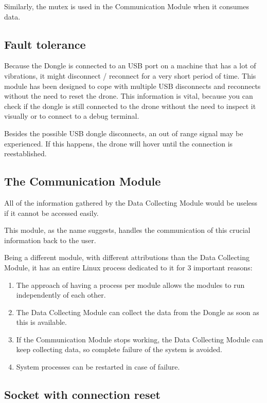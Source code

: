 Similarly, the mutex is used in the Communication Module when it consumes data.


\subsection{Fault tolerance}

Because the Dongle is connected to an USB port on a machine that has a lot of vibrations, it might disconnect / reconnect for a very short period of time. This module has been designed to cope with multiple USB disconnects and reconnects without the need to reset the drone. This information is vital, because you can check if the dongle is still connected to the drone without the need to inspect it visually or to connect to a debug terminal.

Besides the possible USB dongle disconnects, an out of range signal may be experienced. If this happens, the drone will hover until the connection is reestablished.

\subsection{The Communication Module}

All of the information gathered by the Data Collecting Module would be useless if it cannot be accessed easily.

This module, as the name suggests, handles the communication of this crucial information back to the user.

Being a different module, with different attributions than the Data Collecting Module, it has an entire Linux process dedicated to it for 3 important reasons:
\begin{enumerate}

\item The approach of having a process per module allows the modules to run independently of each other.
\item The Data Collecting Module can collect the data from the Dongle as soon as this is available.
\item If the Communication Module stops working, the Data Collecting Module can keep collecting data, so complete failure of the system is avoided.
\item System processes can be restarted in case of failure.

\end{enumerate}

\subsection{Socket with connection reset}

